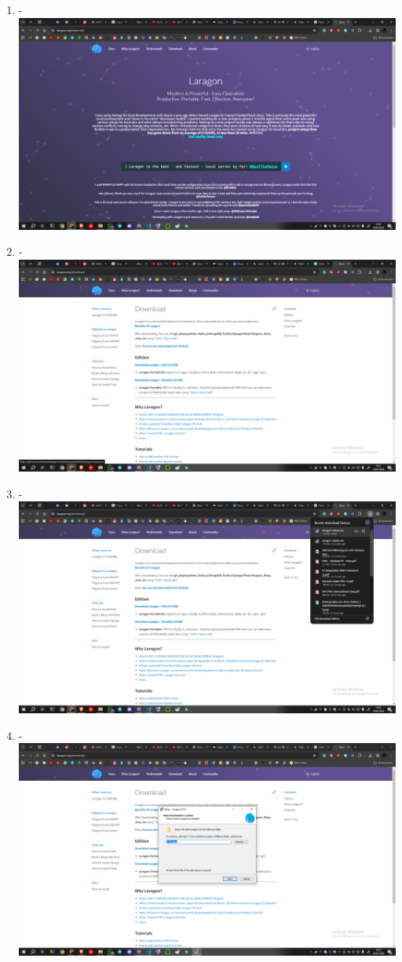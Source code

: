 \documentclass[12pt,titlepage]{article}
\begin{document}
\begin{enumerate}[label= \alph*.]
    \item - \\ \includegraphics[width=.9\textwidth]{images/figures/Laragon 1.png}
    \item - \\ \includegraphics[width=.9\textwidth]{images/figures/Laragon 2.png}
    \newpage
    \item - \\ \includegraphics[width=.9\textwidth]{images/figures/Laragon 3.png}
    \item - \\ \includegraphics[width=.9\textwidth]{images/figures/Laragon 4.png}

\end{enumerate}
\end{document}
